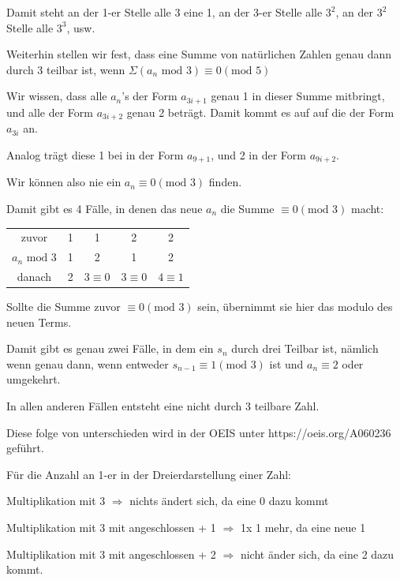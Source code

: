 \documentclass[11pt]{article}
\begin{document}
    Damit steht an der 1-er Stelle alle 3 eine 1, an der 3-er Stelle alle $3^2$, an der $3^2$ Stelle
    alle $3^3$, usw.

    \bigskip

    Weiterhin stellen wir fest, dass eine Summe von natürlichen Zahlen genau dann durch 3 teilbar ist,
    wenn $\Sigma(a_n\text{ mod }3) \equiv 0 (\text{mod }5)$

    Wir wissen, dass alle $a_n$'s der Form $a_{3i+1}$ genau 1 in dieser Summe mitbringt,
    und alle der Form $a_{3i+2}$ genau 2 beträgt.
    Damit kommt es auf auf die der Form $a_{3i}$ an.

    Analog trägt diese 1 bei in der Form $a_{9+1}$, und 2 in der Form $a_{9i+2}$.

    Wir können also nie ein $a_n \equiv 0 (\text{mod }3)$ finden.

    Damit gibt es 4 Fälle, in denen das neue $a_n$ die Summe $\equiv 0 (\text{mod }3)$ macht:

    \begin{tabular}{c c c c c}
        zuvor & 1 & 1 & 2 & 2 \\
        $a_n \text{ mod } 3$ & 1 & 2 & 1 & 2 \\
        danach & 2 & $3 \equiv 0$ & $3 \equiv 0$ & $4 \equiv 1$
    \end{tabular}

    \bigskip

    Sollte die Summe zuvor $\equiv 0 (\text{mod } 3)$ sein, übernimmt sie hier das modulo des neuen Terms.

    Damit gibt es genau zwei Fälle, in dem ein $s_n$ durch drei Teilbar ist, nämlich wenn
    genau dann, wenn entweder $s_{n-1} \equiv 1 (\text{mod } 3)$ ist und $a_n \equiv 2$ oder umgekehrt.

    In allen anderen Fällen entsteht eine nicht durch 3 teilbare Zahl.

    Diese folge von unterschieden wird in der OEIS unter https://oeis.org/A060236 geführt.

    \bigskip

    Für die Anzahl an 1-er in der Dreierdarstellung einer Zahl:

    Multiplikation mit 3 $\Rightarrow$ nichts ändert sich, da eine 0 dazu kommt

    Multiplikation mit 3 mit angeschlossen + 1 $\Rightarrow$ 1x 1 mehr, da eine neue 1

    Multiplikation mit 3 mit angeschlossen + 2 $\Rightarrow$ nicht änder sich, da eine 2 dazu kommt.
\end{document}
